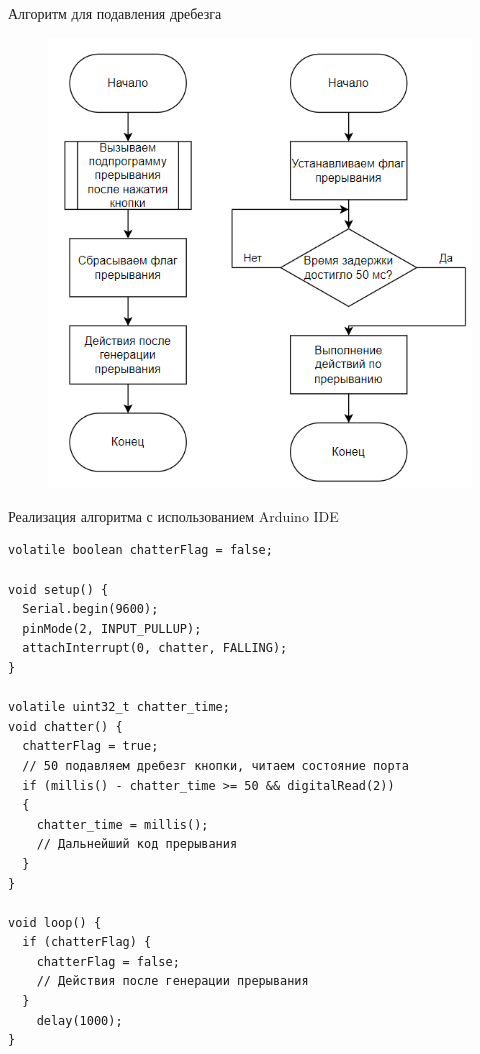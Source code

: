 \documentclass[12pt,a4paper,mathserif]{beamer}
\begin{document}
\begin{frame}{Алгоритм для подавления дребезга}
    \begin{figure}
        \centering
        \includegraphics[scale=0.4]{algorithm.png}
        \label{fig:algorithm}
    \end{figure}
\end{frame}

\newlength\someheight
\setlength{}

\begin{frame}[fragile]{Реализация алгоритма с использованием Arduino IDE}
    \begin{adjustbox}{width=\textwidth,height=\someheight,keepaspectratio}
    \begin{minipage}{1\linewidth}
    \begin{verbatim} 
volatile boolean chatterFlag = false; 
 
void setup() {
  Serial.begin(9600);
  pinMode(2, INPUT_PULLUP); 
  attachInterrupt(0, chatter, FALLING);
}
 
volatile uint32_t chatter_time;
void chatter() {
  chatterFlag = true;
  // 50 подавляем дребезг кнопки, читаем состояние порта
  if (millis() - chatter_time >= 50 && digitalRead(2))
  {
    chatter_time = millis();
    // Дальнейший код прерывания
  }
}
 
void loop() {
  if (chatterFlag) {
    chatterFlag = false;    
    // Действия после генерации прерывания
  } 
    delay(1000);              
}
    \end{verbatim}
    \end{minipage}
    \end{adjustbox}
\end{frame}
\end{document}
